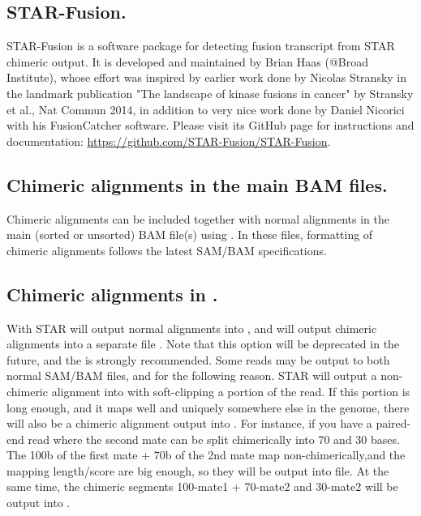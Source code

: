 \documentclass[12pt]{article}
\begin{document}
\subsection{STAR-Fusion.}
STAR-Fusion is a software package for detecting fusion transcript from STAR chimeric output. It is developed and maintained by Brian Haas (@Broad Institute), whose effort was  inspired by earlier work done by Nicolas Stransky in the landmark publication "The landscape of kinase fusions in cancer" by Stransky et al., Nat Commun 2014, in addition to very nice work done by Daniel Nicorici with his FusionCatcher software. Please visit its GitHub page for instructions and documentation: \url{https://github.com/STAR-Fusion/STAR-Fusion}.

\subsection{Chimeric alignments in the main BAM files.}
Chimeric alignments can be included together with normal alignments in the main (sorted or unsorted) BAM file(s) using  . In these files, formatting of chimeric alignments follows the latest SAM/BAM specifications.
   
\subsection{Chimeric alignments in  .}
With   STAR will output normal alignments into , and will output chimeric alignments into a separate file . Note that this option will be deprecated in the future, and the   is strongly recommended.
Some reads may be output to both normal SAM/BAM files, and  for the following reason. STAR will output a non-chimeric alignment into  with soft-clipping a portion of the read. If this portion is long enough, and it maps well and uniquely  somewhere else in the genome, there will also be a chimeric alignment output into . For instance, if you have a paired-end read where the second mate can be split chimerically into 70 and 30 bases. The 100b of the first mate + 70b of the 2nd mate map non-chimerically,and the mapping length/score are big enough, so they will be output into  file. At the same time, the chimeric segments 100-mate1 + 70-mate2 and 30-mate2 will be output into .
\end{document}
